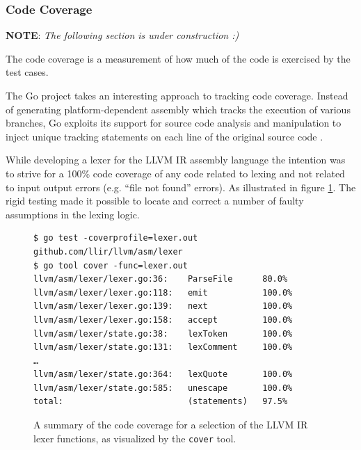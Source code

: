
\subsubsection{Code Coverage}

\textbf{NOTE}: \textit{The following section is under construction :)}

The code coverage is a measurement of how much of the code is exercised by the test cases.


The Go project takes an interesting approach to tracking code coverage. Instead of generating platform-dependent assembly which tracks the execution of various branches, Go exploits its support for source code analysis and manipulation to inject unique tracking statements on each line of the original source code \cite{go_cover}.

While developing a lexer for the LLVM IR assembly language the intention was to strive for a 100\% code coverage of any code related to lexing and not related to input output errors (e.g. ``file not found'' errors). As illustrated in figure \ref{fig:lexer_code_coverage}. The rigid testing made it possible to locate and correct a number of faulty assumptions in the lexing logic.

\begin{figure}[htbp]
	\begin{center}
		\begin{verbatim}
$ go test -coverprofile=lexer.out github.com/llir/llvm/asm/lexer
$ go tool cover -func=lexer.out
llvm/asm/lexer/lexer.go:36:    ParseFile      80.0%
llvm/asm/lexer/lexer.go:118:   emit           100.0%
llvm/asm/lexer/lexer.go:139:   next           100.0%
llvm/asm/lexer/lexer.go:158:   accept         100.0%
llvm/asm/lexer/state.go:38:    lexToken       100.0%
llvm/asm/lexer/state.go:131:   lexComment     100.0%
…
llvm/asm/lexer/state.go:364:   lexQuote       100.0%
llvm/asm/lexer/state.go:585:   unescape       100.0%
total:                         (statements)   97.5%
		\end{verbatim}
		\caption{A summary of the code coverage for a selection of the LLVM IR lexer functions, as visualized by the \texttt{cover} tool.}
		\label{fig:lexer_code_coverage}
	\end{center}
\end{figure}

